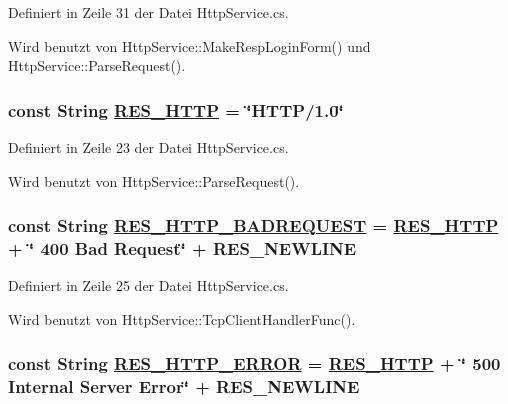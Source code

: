 Definiert in Zeile 31 der Datei Http\-Service.cs.

Wird benutzt von Http\-Service::Make\-Resp\-Login\-Form() und Http\-Service::Parse\-Request().\hypertarget{classQbeSAS_1_1HttpService_QbeSAS_1_1HttpServicer5}{
\subsubsection[RES\_\-HTTP]{\setlength{\rightskip}{0pt plus 5cm}const String \hyperlink{classQbeSAS_1_1HttpService_QbeSAS_1_1HttpServicer5}{RES\_\-HTTP} = \char`\"{}HTTP/1.0\char`\"{}}}
\label{classQbeSAS_1_1HttpService_QbeSAS_1_1HttpServicer5}




Definiert in Zeile 23 der Datei Http\-Service.cs.

Wird benutzt von Http\-Service::Parse\-Request().\hypertarget{classQbeSAS_1_1HttpService_QbeSAS_1_1HttpServicer7}{
\subsubsection[RES\_\-HTTP\_\-BADREQUEST]{\setlength{\rightskip}{0pt plus 5cm}const String \hyperlink{classQbeSAS_1_1HttpService_QbeSAS_1_1HttpServicer7}{RES\_\-HTTP\_\-BADREQUEST} = \hyperlink{classQbeSAS_1_1HttpService_QbeSAS_1_1HttpServicer5}{RES\_\-HTTP} + \char`\"{} 400 Bad Request\char`\"{} + RES\_\-NEWLINE}}
\label{classQbeSAS_1_1HttpService_QbeSAS_1_1HttpServicer7}




Definiert in Zeile 25 der Datei Http\-Service.cs.

Wird benutzt von Http\-Service::Tcp\-Client\-Handler\-Func().\hypertarget{classQbeSAS_1_1HttpService_QbeSAS_1_1HttpServicer9}{
\subsubsection[RES\_\-HTTP\_\-ERROR]{\setlength{\rightskip}{0pt plus 5cm}const String \hyperlink{classQbeSAS_1_1HttpService_QbeSAS_1_1HttpServicer9}{RES\_\-HTTP\_\-ERROR} = \hyperlink{classQbeSAS_1_1HttpService_QbeSAS_1_1HttpServicer5}{RES\_\-HTTP} + \char`\"{} 500 Internal Server Error\char`\"{} + RES\_\-NEWLINE}}
\label{classQbeSAS_1_1HttpService_QbeSAS_1_1HttpServicer9}




